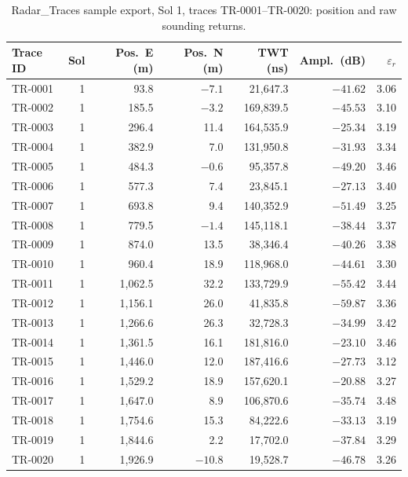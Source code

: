 \documentclass[11pt]{article}
\begin{document}
\begin{table}[H]
\centering
\footnotesize
\begin{tabular}{lrrrrrr}
\toprule
Trace ID & Sol & Pos.\ E (m) & Pos.\ N (m) & TWT (ns) & Ampl.\ (dB) & $\varepsilon_r$ \\
\midrule
TR-0001 & 1 & 93.8 & $-7.1$ & 21{,}647.3 & $-41.62$ & 3.06 \\
TR-0002 & 1 & 185.5 & $-3.2$ & 169{,}839.5 & $-45.53$ & 3.10 \\
TR-0003 & 1 & 296.4 & 11.4 & 164{,}535.9 & $-25.34$ & 3.19 \\
TR-0004 & 1 & 382.9 & 7.0 & 131{,}950.8 & $-31.93$ & 3.34 \\
TR-0005 & 1 & 484.3 & $-0.6$ & 95{,}357.8 & $-49.20$ & 3.46 \\
TR-0006 & 1 & 577.3 & 7.4 & 23{,}845.1 & $-27.13$ & 3.40 \\
TR-0007 & 1 & 693.8 & 9.4 & 140{,}352.9 & $-51.49$ & 3.25 \\
TR-0008 & 1 & 779.5 & $-1.4$ & 145{,}118.1 & $-38.44$ & 3.37 \\
TR-0009 & 1 & 874.0 & 13.5 & 38{,}346.4 & $-40.26$ & 3.38 \\
TR-0010 & 1 & 960.4 & 18.9 & 118{,}968.0 & $-44.61$ & 3.30 \\
TR-0011 & 1 & 1{,}062.5 & 32.2 & 133{,}729.9 & $-55.42$ & 3.44 \\
TR-0012 & 1 & 1{,}156.1 & 26.0 & 41{,}835.8 & $-59.87$ & 3.36 \\
TR-0013 & 1 & 1{,}266.6 & 26.3 & 32{,}728.3 & $-34.99$ & 3.42 \\
TR-0014 & 1 & 1{,}361.5 & 16.1 & 181{,}816.0 & $-23.10$ & 3.46 \\
TR-0015 & 1 & 1{,}446.0 & 12.0 & 187{,}416.6 & $-27.73$ & 3.12 \\
TR-0016 & 1 & 1{,}529.2 & 18.9 & 157{,}620.1 & $-20.88$ & 3.27 \\
TR-0017 & 1 & 1{,}647.0 & 8.9 & 106{,}870.6 & $-35.74$ & 3.48 \\
TR-0018 & 1 & 1{,}754.6 & 15.3 & 84{,}222.6 & $-33.13$ & 3.19 \\
TR-0019 & 1 & 1{,}844.6 & 2.2 & 17{,}702.0 & $-37.84$ & 3.29 \\
TR-0020 & 1 & 1{,}926.9 & $-10.8$ & 19{,}528.7 & $-46.78$ & 3.26 \\
\bottomrule
\end{tabular}
\caption{Radar\_Traces sample export, Sol 1, traces TR-0001--TR-0020: position and raw sounding
returns.}
\label{tab:sample-record}
\end{table}
\end{document}
